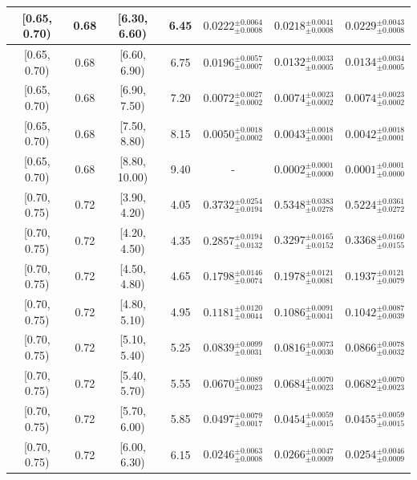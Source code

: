 \begin{longtable}{|c|c|c|c|c|c|c|}
\hline
[0.65, 0.70) & 0.68 & [6.30, 6.60) & 6.45 & $0.0222^{ \pm 0.0064 }_{ \pm 0.0008 }$ & $0.0218^{ \pm 0.0041 }_{ \pm 0.0008 }$ & $0.0229^{ \pm 0.0043 }_{ \pm 0.0008 }$ \\ 
\hline
[0.65, 0.70) & 0.68 & [6.60, 6.90) & 6.75 & $0.0196^{ \pm 0.0057 }_{ \pm 0.0007 }$ & $0.0132^{ \pm 0.0033 }_{ \pm 0.0005 }$ & $0.0134^{ \pm 0.0034 }_{ \pm 0.0005 }$ \\ 
\hline
[0.65, 0.70) & 0.68 & [6.90, 7.50) & 7.20 & $0.0072^{ \pm 0.0027 }_{ \pm 0.0002 }$ & $0.0074^{ \pm 0.0023 }_{ \pm 0.0002 }$ & $0.0074^{ \pm 0.0023 }_{ \pm 0.0002 }$ \\ 
\hline
[0.65, 0.70) & 0.68 & [7.50, 8.80) & 8.15 & $0.0050^{ \pm 0.0018 }_{ \pm 0.0002 }$ & $0.0043^{ \pm 0.0018 }_{ \pm 0.0001 }$ & $0.0042^{ \pm 0.0018 }_{ \pm 0.0001 }$ \\ 
\hline
[0.65, 0.70) & 0.68 & [8.80, 10.00) & 9.40 & - & $0.0002^{ \pm 0.0001 }_{ \pm 0.0000 }$ & $0.0001^{ \pm 0.0001 }_{ \pm 0.0000 }$ \\ 
\hline
[0.70, 0.75) & 0.72 & [3.90, 4.20) & 4.05 & $0.3732^{ \pm 0.0254 }_{ \pm 0.0194 }$ & $0.5348^{ \pm 0.0383 }_{ \pm 0.0278 }$ & $0.5224^{ \pm 0.0361 }_{ \pm 0.0272 }$ \\ 
\hline
[0.70, 0.75) & 0.72 & [4.20, 4.50) & 4.35 & $0.2857^{ \pm 0.0194 }_{ \pm 0.0132 }$ & $0.3297^{ \pm 0.0165 }_{ \pm 0.0152 }$ & $0.3368^{ \pm 0.0160 }_{ \pm 0.0155 }$ \\ 
\hline
[0.70, 0.75) & 0.72 & [4.50, 4.80) & 4.65 & $0.1798^{ \pm 0.0146 }_{ \pm 0.0074 }$ & $0.1978^{ \pm 0.0121 }_{ \pm 0.0081 }$ & $0.1937^{ \pm 0.0121 }_{ \pm 0.0079 }$ \\ 
\hline
[0.70, 0.75) & 0.72 & [4.80, 5.10) & 4.95 & $0.1181^{ \pm 0.0120 }_{ \pm 0.0044 }$ & $0.1086^{ \pm 0.0091 }_{ \pm 0.0041 }$ & $0.1042^{ \pm 0.0087 }_{ \pm 0.0039 }$ \\ 
\hline
[0.70, 0.75) & 0.72 & [5.10, 5.40) & 5.25 & $0.0839^{ \pm 0.0099 }_{ \pm 0.0031 }$ & $0.0816^{ \pm 0.0073 }_{ \pm 0.0030 }$ & $0.0866^{ \pm 0.0078 }_{ \pm 0.0032 }$ \\ 
\hline
[0.70, 0.75) & 0.72 & [5.40, 5.70) & 5.55 & $0.0670^{ \pm 0.0089 }_{ \pm 0.0023 }$ & $0.0684^{ \pm 0.0070 }_{ \pm 0.0023 }$ & $0.0682^{ \pm 0.0070 }_{ \pm 0.0023 }$ \\ 
\hline
[0.70, 0.75) & 0.72 & [5.70, 6.00) & 5.85 & $0.0497^{ \pm 0.0079 }_{ \pm 0.0017 }$ & $0.0454^{ \pm 0.0059 }_{ \pm 0.0015 }$ & $0.0455^{ \pm 0.0059 }_{ \pm 0.0015 }$ \\ 
\hline
[0.70, 0.75) & 0.72 & [6.00, 6.30) & 6.15 & $0.0246^{ \pm 0.0063 }_{ \pm 0.0008 }$ & $0.0266^{ \pm 0.0047 }_{ \pm 0.0009 }$ & $0.0254^{ \pm 0.0046 }_{ \pm 0.0009 }$ \\ 

\end{longtable}
